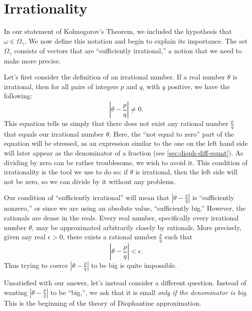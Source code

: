 \documentclass[twoside,letterpaper,11pt]{article}
\numberwithin{equation}{section}
\begin{document}
\section{Irrationality}
\label{sec:irrationality}

In our statement of Kolmogorov's Theorem, we included the hypothesis that
$\omega \in \Omega_{\gamma}$.
We now define this notation and begin to explain its importance.
The set $\Omega_{\gamma}$ consists of vectors that are ``sufficiently
irrational,'' a notion that we need to make more precise.

Let's first consider the definition of an irrational number.
If a real number $\theta$ is irrational, then for all pairs of integers $p$ and
$q$, with $q$ positive, we have the following:
\begin{equation*}
  \left| \theta - \frac{p}{q} \right| \neq 0.
\end{equation*}
This equation tells us simply that there does not exist any rational number
$\frac{p}{q}$ that equals our irrational number $\theta$.
Here, the ``not equal to zero'' part of the equation will be stressed, as an
expression similar to the one on the left hand side will later appear as the
denominator of a fraction (see \cref{sec:dioph-diff-equat}).
As dividing by zero can be rather troublesome, we wish to avoid it.
This condition of irrationality is the tool we use to do so: if $\theta$ is
irrational, then the left side will not be zero, so we can divide by it without
any problems.

Our condition of ``sufficiently irrational'' will mean that $\left| \theta -
  \frac{p}{q} \right|$ is ``sufficiently nonzero,'' or since we are using an
absolute value, ``sufficiently big.''
However, the rationals are dense in the reals.
Every real number, specifically every irrational number $\theta$, may be
approximated arbitrarily closely by rationals.
More precisely, given any real $\epsilon > 0$, there exists a rational number
$\frac{p}{q}$ such that
\begin{equation*}
  \left| \theta - \frac{p}{q} \right| < \epsilon.
\end{equation*}
Thus trying to coerce $\left| \theta - \frac{p}{q} \right|$ to be big is quite
impossible.

Unsatisfied with our answer, let's instead consider a different question.
Instead of wanting $\left| \theta - \frac{p}{q} \right|$ to be ``big,'', we ask
that it is small \emph{only if the denominator is big}.
This is the beginning of the theory of Diophantine approximation.
\end{document}
